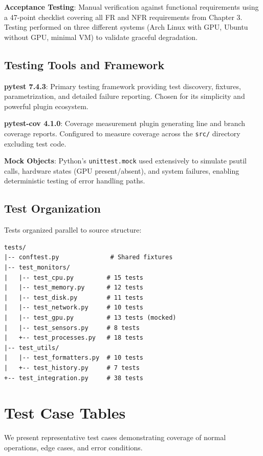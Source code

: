 \documentclass[12pt,a4paper,oneside]{report}
\begin{document}
\textbf{Acceptance Testing}: Manual verification against functional requirements using a 47-point checklist covering all FR and NFR requirements from Chapter 3. Testing performed on three different systems (Arch Linux with GPU, Ubuntu without GPU, minimal VM) to validate graceful degradation.

\subsection{Testing Tools and Framework}

\textbf{pytest 7.4.3}: Primary testing framework providing test discovery, fixtures, parametrization, and detailed failure reporting. Chosen for its simplicity and powerful plugin ecosystem.

\textbf{pytest-cov 4.1.0}: Coverage measurement plugin generating line and branch coverage reports. Configured to measure coverage across the \texttt{src/} directory excluding test code.

\textbf{Mock Objects}: Python's \texttt{unittest.mock} used extensively to simulate psutil calls, hardware states (GPU present/absent), and system failures, enabling deterministic testing of error handling paths.

\subsection{Test Organization}

Tests organized parallel to source structure:
\begin{verbatim}
tests/
|-- conftest.py              # Shared fixtures
|-- test_monitors/
|   |-- test_cpu.py         # 15 tests
|   |-- test_memory.py      # 12 tests
|   |-- test_disk.py        # 11 tests
|   |-- test_network.py     # 10 tests
|   |-- test_gpu.py         # 13 tests (mocked)
|   |-- test_sensors.py     # 8 tests
|   +-- test_processes.py   # 18 tests
|-- test_utils/
|   |-- test_formatters.py  # 10 tests
|   +-- test_history.py     # 7 tests
+-- test_integration.py     # 38 tests
\end{verbatim}

\section{Test Case Tables}
\label{sec:test-cases}

We present representative test cases demonstrating coverage of normal operations, edge cases, and error conditions.
\end{document}
